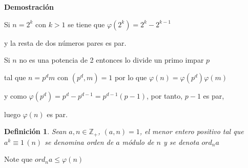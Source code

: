 \documentclass[a4paper,12pt]{report}
\newtheorem*{dfn}{Definición}
\begin{document}
\textbf{Demostración}

Si $n=2^k$ con $k>1$ se tiene que $\varphi(2^k)=2^k-2^{k-1}$ 

y la resta de dos números pares es par.

Si $n$ no es una potencia de 2 entonces lo divide un primo impar $p$ 

tal que $n=p^dm$ con $(p^d,m)=1$ por lo que $\varphi(n)=\varphi(p^d)\varphi(m)$ 

y como $\varphi(p^d)=p^d-p^{d-1}=p^{d-1}(p-1)$, por tanto, $p-1$ es par, 

luego  $\varphi(n)$ es par.


\begin{dfn}
Sean $a,n\in\mathbb{Z}_+$, $(a,n)=1$, el menor entero positivo tal que $a^k \equiv 1 \, (n)$ se denomina
orden de $a$ módulo de $n$ y se denota $ord_na$
\end{dfn}

Note que $ord_na\leq\varphi(n)$
\end{document}
